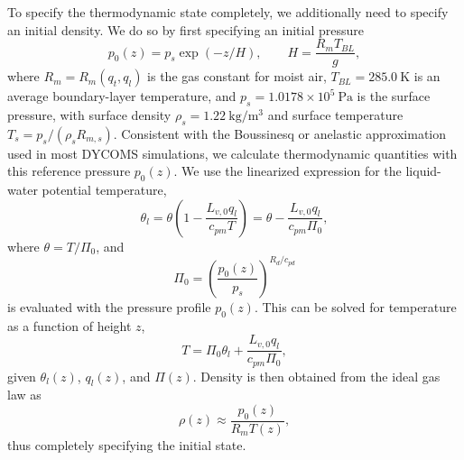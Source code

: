 \documentclass{report}
\begin{document}
To specify the thermodynamic state completely, we additionally need to specify an initial density. We do so by first specifying an initial pressure
\[
p_0(z) = p_{s} \exp(-z/H), \qquad H = \frac{R_m T_{BL}}{g},
\]
where $R_m = R_m(q_t, q_l)$ is the gas constant for moist air, $T_{BL} = 285.0~\mathrm{K}$ is an average boundary-layer temperature, and $p_s = 1.0178\times 10^{5}~\mathrm{Pa}$ is the surface pressure, with surface density $\rho_s = 1.22~\mathrm{kg/m^3}$ and surface temperature $T_s = p_s/(\rho_s R_{m,s})$. Consistent with the Boussinesq or anelastic approximation used in most DYCOMS simulations, we calculate thermodynamic quantities with this reference pressure $p_0(z)$. We use the linearized expression for the liquid-water potential temperature,
\begin{equation}
    \label{eq:betts1973}
    \theta_l = \theta \left(1 - \frac{L_{v,0} q_l}{c_{pm} T} \right) = \theta - \frac{L_{v,0} q_l}{c_{pm} \Pi_0},
\end{equation}
where $\theta = T/\Pi_0$, and 
\[
\Pi_0 = \left( \frac{p_0(z)}{p_{s}} \right)^{R_d/c_{pd}}
\]
is evaluated with the pressure profile $p_0(z)$. This can be solved for temperature as a function of height $z$,
\[
T = \Pi_0 \theta_l + \frac{L_{v,0} q_l}{c_{pm} \Pi_0},
\]
given $\theta_l(z)$, $q_l(z)$, and $\Pi(z)$. Density is then obtained from the ideal gas law as
\[
\rho(z) \approx \frac{p_0(z)}{R_m T(z)},
\]
thus completely specifying the initial state. 
\end{document}
